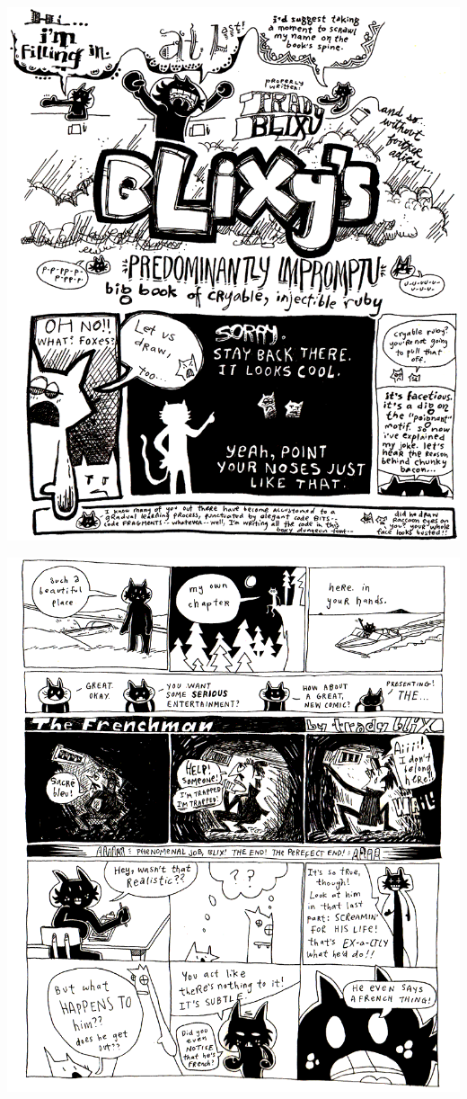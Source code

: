 \documentclass[10pt,twoside]{report}
\begin{document}
\newpage
\thispagestyle{empty}
\mbox{}
\clearpage


\vspace*{0.6cm} \includegraphics[width=1.0\textwidth]{cache/82.png}
\newpage

\vspace*{0.6cm} \includegraphics[width=1.0\textwidth]{cache/83.png}
\newpage
\end{document}
